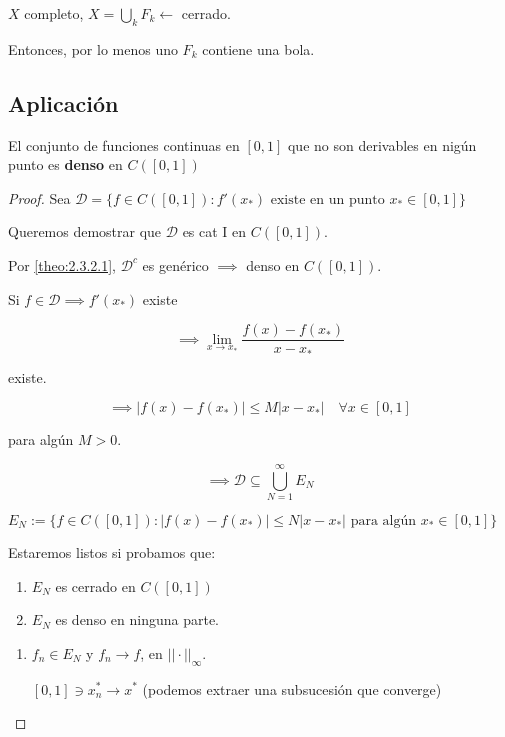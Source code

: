 \begin{fcorollary}
    $X$ completo, $X=\bigcup_k F_k\leftarrow$ cerrado.

    Entonces, por lo menos uno $F_k$ contiene una bola.
\end{fcorollary}

\subsection{Aplicación}

\begin{ftheorem}
    El conjunto de funciones continuas en $[0,1]$ que no son derivables en nigún punto es \textbf{denso} en $C([0,1])$
\end{ftheorem}

\begin{proof}
    Sea $\mathcal{D}=\{f\in C([0,1]):f'(x_*) \text{ existe en un punto } x_*\in [0,1]\}$

    Queremos demostrar que $\mathcal{D}$ es cat I en $C([0,1])$.

    Por \ref{theo:2.3.2.1}, $\mathcal{D}^c$ es genérico $\implies$ denso en $C([0,1])$.

    Si $f\in \mathcal{D}\implies f'(x_*)$ existe

    \[\implies \lim_{x\to x_*} \frac{f(x)-f(x_*)}{x-x_*}\]

    existe.

    \[\implies |f(x)-f(x_*)|\leq M|x-x_*|\quad \forall x\in [0,1]\]

    para algún $M>0$.

    \[\implies \mathcal{D}\subseteq \bigcup_{N=1}^\infty E_N\]

    $E_N:=\{f\in C([0,1]):|f(x)-f(x_*)|\leq N|x-x_*|\text{ para algún $x_*\in[0,1]$}\}$

    Estaremos listos si probamos que:

    \begin{enumerate}
        \item $E_N$ es cerrado en $C([0,1])$
        \item $E_N$ es denso en ninguna parte.
    \end{enumerate}

    \begin{enumerate}
        \item $f_n\in E_N$ y $f_n\to f$, en $||\cdot||_\infty$.
        
        $[0,1]\ni x_n^*\to x^*$ (podemos extraer una subsucesión que converge)


\end{enumerate}
\end{proof}

